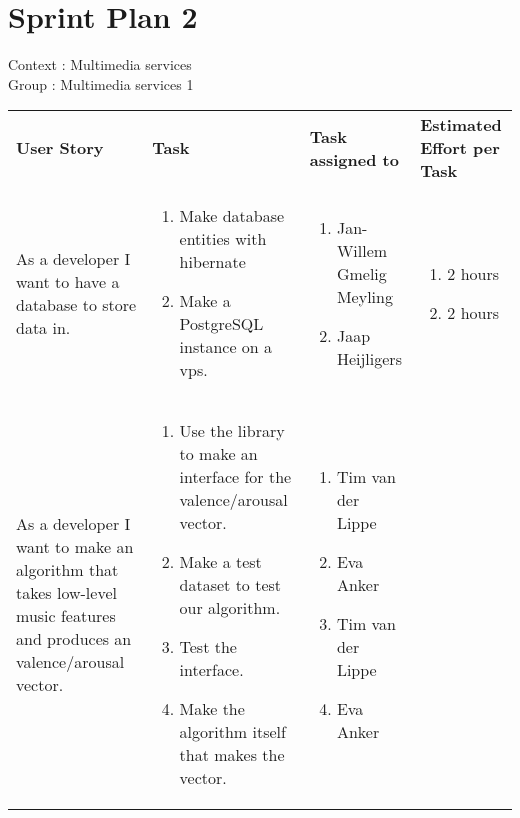 \documentclass[11pt,a4paper]{article}
\begin{document}
\section*{Sprint Plan 2}
Context : Multimedia services\\
Group : Multimedia services 1\\



\begin{table}[h]
\begin{tabular}{|p{4.5cm}|p{7cm}|p{4cm}|p{2.6cm}|}
\textbf{User Story} & \textbf{Task} & \textbf{Task assigned to} & \textbf{Estimated Effort per Task} \\
As a developer I want to have a database to store data in.  & \begin{enumerate}
\item Make database entities with hibernate  
\item Make a PostgreSQL instance on a vps.
\end{enumerate}

& 
\begin{enumerate}
\item Jan-Willem Gmelig Meyling
\item Jaap Heijligers
\end{enumerate}

& 
\begin{enumerate}
\item 2 hours
\item 2 hours
\end{enumerate}
\\

As a developer I want to make an algorithm that takes low-level music features and produces an valence/arousal vector.
&
\begin{enumerate}
\item Use the library to make an interface for the valence/arousal vector.
\item Make a test dataset to test our algorithm.
\item Test the interface.
\item Make the algorithm itself that makes the vector.
\end{enumerate}

&
\begin{enumerate}
\item Tim van der Lippe
\item Eva Anker
\item Tim van der Lippe
\item Eva Anker
\end{enumerate}


\end{tabular}
\end{table}
\end{document}
